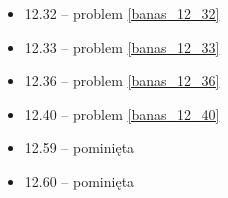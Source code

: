 \begin{multicols}{3}
\begin{itemize}
    \item 12.32 -- problem \ref{banas_12_32}
    \item 12.33 -- problem \ref{banas_12_33}
    \item 12.36 -- problem \ref{banas_12_36}
    \item 12.40 -- problem \ref{banas_12_40}
    \item 12.59 -- pominięta
    \item 12.60 -- pominięta

\end{itemize}
\end{multicols}
